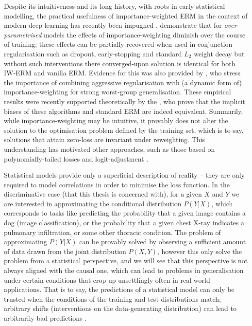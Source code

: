 Despite its intuitiveness and its long history, with roots in early statistical modelling, the
practical usefulness of importance-weighted ERM in the context of modern deep learning has recently
been impugned \citep{byrd2019effect, zhai2022understanding}.
%
\cite{byrd2019effect} demonstrate that for \emph{over-parametrised} models the effects of
importance-weighting diminish over the course of training; these effects can be partially recovered
when used in conjunction regularisation such as dropout, early-stopping and standard \(L_2\) weight
decay but without such interventions there converged-upon solution is identical for both IW-ERM and
vanilla ERM. 
%
Evidence for this was also provided by \cite{sagawa2019distributionally}, who stress the importance
of combining aggressive regularisation with (a dynamic form of) importance-weighting for
strong worst-group generalisation.
%
These empirical results were recently supported theoretically by the \cite{zhai2022understanding},
who prove that the implicit biases of these algorithms and standard ERM are indeed equivalent.
%
Summarily, while importance-weighting may be intuitive, it provably does not alter the solution to
the optimisation problem defined by the training set, which is to say, solutions that attain
zero-loss are invariant under reweighting.
%
This understanding has motivated other approaches, such as those based on polynomially-tailed
losses \citep{wang2021importance} and logit-adjustment \citep{menon2020long}.
%

Statistical models provide only a superficial description of reality -- they are only required to
model correlations in order to minimise the loss function.
%
In the discriminative case (that this thesis is concerned with), for a given \( X \) and \( Y \) we
are interested in approximating the conditional distribution \( P(Y|X) \), which corresponds to
tasks like predicting the probability that a given image contains a dog (image classification), or
the probability that a given chest X-ray indicates a pulmonary infiltration, or some other thoracic
condition.
%
The problem of approximating \( P(Y | X) \) can be provably solved by observing a sufficient amount
of \iid{} data drawn from the joint distribution \( P(X,Y) \), however this only solve the problem
from a statistical perspective, and we will see that this perspective is not always aligned with
the causal one, which can lead to problems in generalisation under certain conditions that crop up
unsettlingly often in real-world applications. 
%
That is to say, the predictions of a statistical model can only be trusted when the conditions of
the training and test distributions match; arbitrary shifts (interventions on the data-generating
distribution) can lead to arbitrarily bad predictions \citep{pearl2009causality, scholkopf2012causal}.

